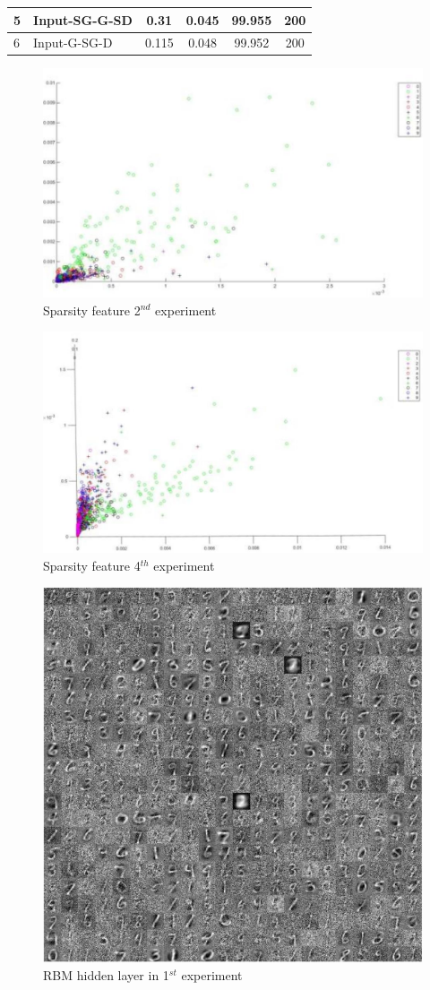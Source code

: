 \documentclass[conference]{IEEEtran}
\begin{document}
\begin{table}[h]
\begin{tabular}{|l|l|c|c|c|c|}
		5                                                                                & Input-SG-G-SD                               & 0.31                                                                 & 0.045                                                               & 99.955                                                           & 200            \\ \hline
		6                                                                                & Input-G-SG-D                                & 0.115                                                                & 0.048                                                               & 99.952                                                           & 200            \\ \hline
	\end{tabular}
\end{table}

\begin{figure}[h]
	\centering
	\includegraphics[width=.5\textwidth]{pics/fig2.jpg}
	\caption{Sparsity feature 2$^{nd}$ experiment}
	\label{fig2}
\end{figure}

\begin{figure}[h]
	\centering
	\includegraphics[width=.5\textwidth]{pics/fig3.jpg}
	\caption{Sparsity feature 4$^{th}$ experiment}
	\label{fig3}
\end{figure}

\begin{figure}[h]
	\centering
	\includegraphics[width=.5\textwidth]{pics/fig4.jpg}
	\caption{RBM hidden layer in 1$^{st}$ experiment}
	\label{fig4}
\end{figure}
\end{document}
